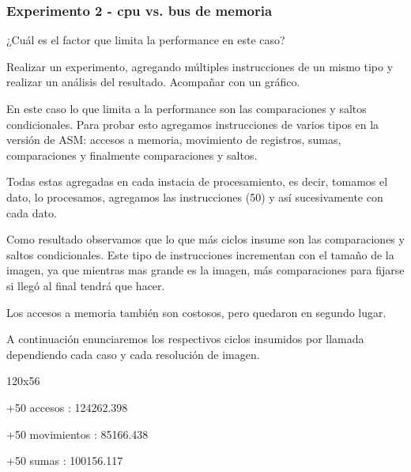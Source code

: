 \vspace*{0.3cm} \noindent
\subsubsection{Experimento 2 - cpu vs. bus de memoria}

	¿Cuál es el factor que limita la performance en este caso? 
	
	Realizar un experimento, agregando múltiples instrucciones de un mismo tipo
	y realizar un análisis 	del resultado. Acompañar con un gráfico.\vspace*{0.3cm} \noindent

  



  En este caso lo que limita a la performance son las comparaciones y saltos condicionales.
  Para probar esto agregamos instrucciones de varios tipos en la versión de ASM: accesos a memoria, 
  movimiento de registros, sumas, comparaciones y finalmente comparaciones y saltos. \vspace*{0.2cm} \noindent




  Todas estas agregadas en cada instacia de procesamiento, es decir, tomamos el dato, lo procesamos,
  agregamos las instrucciones (50) y así sucesivamente con cada dato.\vspace*{0.2cm} \noindent




  Como resultado observamos que lo que más ciclos insume son las comparaciones y saltos condicionales. 
  Este tipo de instrucciones incrementan con el tamaño de la imagen, ya que mientras mas grande es la imagen, 
  más comparaciones para fijarse si llegó al final tendrá que hacer.\vspace*{0.2cm} \noindent




  Los accesos a memoria también son costosos, pero quedaron en segundo lugar.\vspace*{0.2cm} \noindent
  
  A continuación enunciaremos los respectivos ciclos insumidos por llamada dependiendo cada caso y cada 
  resolución de imagen.\vspace*{0.3cm} \noindent
 
 120x56 
 
+50 accesos		: 124262.398

+50 movimientos		: 85166.438

+50 sumas		: 100156.117

